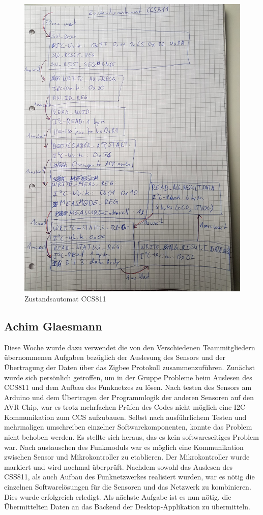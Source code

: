\documentclass[]{article}
\begin{document}
\begin{figure}[h]
	\centering
	\includegraphics[scale=0.20]{images/zustandsautomat_ccs811}
	\caption{Zustandsautomat CCS811}
	\label{img:Zustandsautomat}
\end{figure}

\subsection{Achim Glaesmann}
Diese Woche wurde dazu verwendet die von den Verschiedenen Teammitgliedern übernommenen Aufgaben bezüglich der Auslesung des Sensors und der Übertragung der Daten über das Zigbee Protokoll zusammenzuführen. Zunächst wurde sich persönlich getroffen, um in der Gruppe Probleme beim Auslesen des CCS811 und dem Aufbau des Funknetzes zu lösen. Nach testen des Sensors am Arduino und dem Übertragen der Programmlogik der anderen Sensoren auf den AVR-Chip, war es trotz mehrfachen Prüfen des Codes nicht möglich eine I2C-Kommunikation zum CCS aufzubauen. Selbst nach ausführlichem Testen und mehrmaligen umschreiben einzelner Softwarekomponenten, konnte das Problem nicht behoben werden. Es stellte sich heraus, das es kein softwareseitiges Problem war. Nach austauschen des Funkmoduls war es möglich eine Kommunikation zwischen Sensor und Mikrokontroller zu etablieren. Der Mikrokontroller wurde markiert und wird nochmal überprüft. Nachdem sowohl das Auslesen des CSS811, als auch Aufbau des Funknetzwerkes realisiert wurden, war es nötig die einzelnen Softwarelösungen für die Sensoren und das Netzwerk zu kombinieren. Dies wurde erfolgreich erledigt. Als nächste Aufgabe ist es nun nötig, die Übermittelten Daten an das Backend der Desktop-Applikation zu übermitteln.
\end{document}

